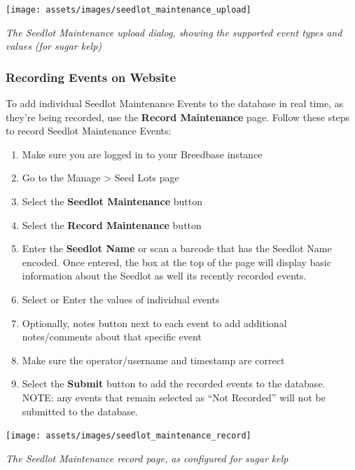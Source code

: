 \documentclass[
  12pt,
]{book}
\providecommand{\tightlist}{%
  \setlength{\itemsep}{0pt}\setlength{\parskip}{0pt}}
\begin{document}
\begin{center}\texttt{[image: assets/images/seedlot\_maintenance\_upload]} \end{center}

\emph{The Seedlot Maintenance upload dialog, showing the supported event types and values (for sugar kelp)}

\hypertarget{recording-events-on-website}{%
\subsubsection*{Recording Events on Website}\label{recording-events-on-website}}


To add individual Seedlot Maintenance Events to the database in real time, as they're being recorded, use the \textbf{Record Maintenance} page. Follow these steps to record Seedlot Maintenance Events:

\begin{enumerate}
\def\labelenumi{\arabic{enumi}.}
\tightlist
\item
  Make sure you are logged in to your Breedbase instance
\item
  Go to the Manage \textgreater{} Seed Lots page
\item
  Select the \textbf{Seedlot Maintenance} button
\item
  Select the \textbf{Record Maintenance} button
\item
  Enter the \textbf{Seedlot Name} or scan a barcode that has the Seedlot Name encoded. Once entered, the box at the top of the page will display basic information about the Seedlot as well its recently recorded events.
\item
  Select or Enter the values of individual events
\item
  Optionally, notes button next to each event to add additional notes/comments about that specific event
\item
  Make sure the operator/username and timestamp are correct
\item
  Select the \textbf{Submit} button to add the recorded events to the database. NOTE: any events that remain selected as ``Not Recorded'' will not be submitted to the database.
\end{enumerate}

\begin{center}\texttt{[image: assets/images/seedlot\_maintenance\_record]} \end{center}

\emph{The Seedlot Maintenance record page, as configured for sugar kelp}
\end{document}
